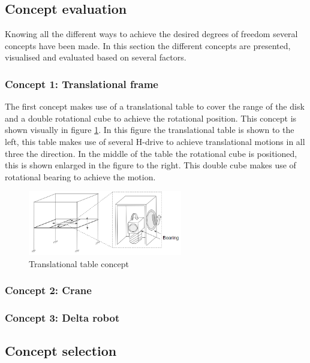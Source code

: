 \subsection{Concept evaluation}
Knowing all the different ways to achieve the desired degrees of freedom several concepts have been made. In this section the different concepts are presented, visualised and evaluated based on several factors.
\subsubsection{Concept 1: Translational frame}
The first concept makes use of a translational table to cover the range of the disk and a double rotational cube to achieve the rotational position. This concept is shown visually in figure \ref{fig:convential_concept_1}. In this figure the translational table is shown to the left, this table makes use of several H-drive to achieve translational motions in all three the direction. In the middle of the table the rotational cube is positioned, this is shown enlarged in the figure to the right. This double cube makes use of rotational bearing to achieve the motion.
\begin{figure}[!h]
    \centering
    \includegraphics[width=0.6\textwidth]{images/Conventional_concept_1.PNG}
    \caption{Translational table concept}
    \label{fig:convential_concept_1}
\end{figure}



\subsubsection{Concept 2: Crane}




\subsubsection{Concept 3: Delta robot}


\subsection{Concept selection}

